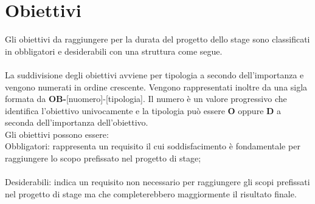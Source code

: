 \section{Obiettivi}

Gli obiettivi da raggiungere per la durata del progetto dello stage sono classificati in obbligatori e desiderabili con una struttura come segue.
\\ \\
 
La suddivisione degli obiettivi avviene per tipologia a secondo dell'importanza e vengono numerati in ordine crescente. Vengono rappresentati inoltre da una sigla formata da \textbf{OB-}[nuomero]-[tipologia]. Il numero è un valore progressivo che identifica l'obiettivo univocamente e la tipologia può essere \textbf{O} oppure \textbf{D} a seconda dell'importanza dell'obiettivo. \\

Gli obiettivi possono essere: \\

Obbligatori: rappresenta un requisito il cui soddisfacimento è fondamentale
per raggiungere lo scopo prefissato nel progetto di stage;
\\\\
Desiderabili: indica un requisito non necessario per raggiungere gli scopi
prefissati nel progetto di stage ma che completerebbero maggiormente il risultato finale.
\\\\



